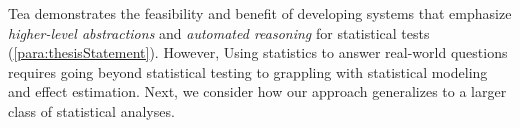 Tea demonstrates the feasibility and benefit of developing systems that
emphasize \textit{higher-level abstractions} and \textit{automated reasoning}
for statistical tests (\autoref{para:thesisStatement}). However, Using
statistics to answer real-world questions requires going beyond statistical
testing to grappling with statistical modeling and effect estimation. Next, we
consider how our approach generalizes to a larger class of statistical analyses. 

\begin{comment}
4-5 sentences: 
1. Restate problem 
2. Articulate core contributions: problem/idea + technical
3. Key Evaluation results
4. 1 soundbite/takeaway
5. Transition to next chapter. 

1. Restate problem 

A common approach to assessing support for conceptual hypotheses in data is to
use statistical tests (e.g., Student's t-test, Chi-Square test, ANOVA).
Statistical testing requires analysts to grapple with their conceptual
hypotheses, know a number of tests and when they are applicable (i.e., know the
preconditions for when these tests hold), assess the applicability of tests
(i.e., check preconditions), and pick and implement specific tests using
low-level APIs. 

2. Articulate core contributions: problem/idea + technical

Tea's key insight is that we can reformulate statistical test selection as a
constraint satisfaction problem. We designed and implemented a higher-level DSL
around this insight that takes an analyst's hypothesis and assumptions about
their data as input and provides the results of executing valid statistical
tests as output. 

3. Key Evaluation results

In an evaluation, we found that Tea avoids faulty test
selection and conclusions that are easy to make using existing tools.

4. 1 soundbite/takeaway 

It is possible to design higher level language and automated reasoning to select
valid statistical tests that are widely used and even avoid faulty conclusions
that are easy to make using existing tools. The key is to make implicit
assumptions about the data explicit and reason about analyst assumptions and
computed data properties together in a logical constraint system. 

5. Transition to next chapter. 

However, an important limitation to overcome in the future chapters, most
notably in Tisane (~\autoref{chapter:tisane}) is how to generalize automated
support for more complex research questions and statistical analyses. 

Tea demonstrates the feasibility and benefit of developing systems that
emphasize \textit{higher-level abstractions} and \textit{automated reasoning}
for statistical tests (\autoref{para:thesisStatement}). Next, we consider how
this approach generalizes to a larger class of statistical analyses. could
\end{comment}

